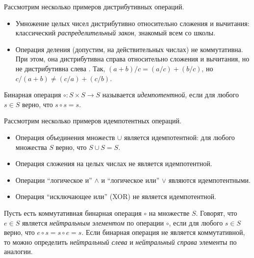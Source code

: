 \begin{example}
    Рассмотрим несколько примеров дистрибутивных операций.
    \begin{itemize}
        \item Умножение целых чисел дистрибутивно относительно сложения и вычитания: классический \emph{распределительный закон}, знакомый всем со школы.
        \item Операция деления (допустим, на действительных числах) не коммутативна.
              При этом, она дистрибутивна справа относительно сложения и вычитания, но не дистрибутивна слева%
              .
              Так, $(a + b) / c = (a / c) + (b / c)$, но $c / (a + b) \neq (c / a) + (c / b)$.
    \end{itemize}
\end{example}

\begin{definition}
    Бинарная операция $\circ: S \times S \to S$ называется \emph{идемпотентной}, если для любого  $s \in S$ верно, что  $s \circ s = s$.
\end{definition}

\begin{example}
    Рассмотрим несколько примеров идемпотентных операций.
    \begin{itemize}
        \item Операция объединения множеств $\cup$ является идемпотентной: для любого множества $S$ верно, что $S \cup S = S$.
        \item Операция сложения на целых числах не является идемпотентной.
        \item Операции \enquote{логическое и} $\land$ и \enquote{логическое или} $\lor$ являются идемпотентными.
        \item Операция \enquote{исключающее или} (\textsf{XOR}) не является идемпотентной.
    \end{itemize}
\end{example}

\begin{definition}
    Пусть есть коммутативная бинарная операция $\circ$ на множестве $S$.
    Говорят, что $e \in S$ является \emph{нейтральным элементом} по операции $\circ$, если для любого $s \in S$ верно, что $e \circ s = s \circ e = s$.
    Если бинарная операция не является коммутативной, то можно определить \emph{нейтральный слева} и \emph{нейтральный справа} элементы по аналогии.
\end{definition}

